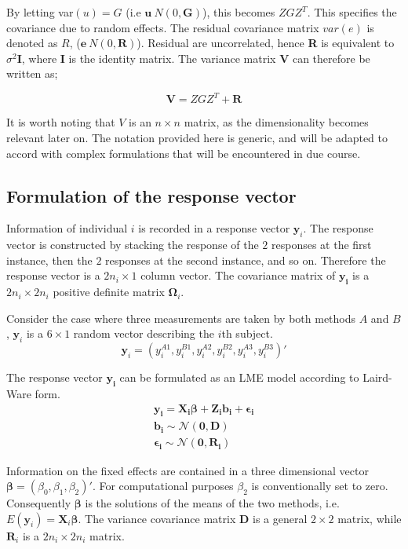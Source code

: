 \documentclass[12pt, a4paper]{report}
\theoremstyle{plain}
\theoremstyle{definition}
\theoremstyle{remark}
\begin{document}
By letting var$(u) = G$ (i.e $\textbf{u} ~ N(0,\textbf{G})$), this
becomes $ZGZ^{T}$. This specifies the covariance due to random
effects. The residual covariance matrix $var(e)$ is denoted as
$R$, ($\textbf{e} ~ N(0,\textbf{R})$). Residual are uncorrelated,
hence \textbf{R} is equivalent to $\sigma^{2}$\textbf{I}, where
\textbf{I} is the identity matrix. The variance matrix \textbf{V}
can therefore be written as;

\begin{equation}
\textbf{V}  = ZGZ^{T} + \textbf{R}
\end{equation}

It is worth noting that $V$ is an $n \times n$ matrix, as the dimensionality becomes relevant later on. The notation provided here is generic, and will be adapted to accord with complex formulations that will be encountered in due course.

\newpage

\subsection{Formulation of the response vector}
Information of individual $i$ is recorded in a response vector $\boldsymbol{y}_{i}$. The response vector is constructed by stacking the response of the $2$ responses at the first instance, then the $2$ responses at the second instance, and so on. Therefore the response vector is a $2n_{i} \times 1$ column vector.
The covariance matrix of $\boldsymbol{y_{i}}$ is a $2n_{i} \times 2n_{i}$ positive definite matrix $\boldsymbol{\Omega}_{i}$.

Consider the case where three measurements are taken by both methods $A$ and $B$, $\boldsymbol{y}_{i}$ is a $6 \times 1$ random vector describing the $i$th subject.
\[
\boldsymbol{y}_{i} = (y_{i}^{A1},y_{i}^{B1},y_{i}^{A2},y_{i}^{B2},y_{i}^{A3},y_{i}^{B3}) \prime
\]

The response vector $\boldsymbol{y_{i}}$ can be formulated as an LME model according to Laird-Ware form.
\begin{eqnarray*}
	\boldsymbol{y_{i}} = \boldsymbol{X_{i}\beta}  + \boldsymbol{Z_{i}b_{i}} + \boldsymbol{\epsilon_{i}}\\
	\boldsymbol{b_{i}} \sim \mathcal{N}(\boldsymbol{0,D})\\
	\boldsymbol{\epsilon_{i}} \sim \mathcal{N}(\boldsymbol{0,R_{i}})
\end{eqnarray*}

Information on the fixed effects are contained in a three dimensional vector $\boldsymbol{\beta} = (\beta_{0},\beta_{1},\beta_{2})\prime$. For computational purposes $\beta_{2}$ is conventionally set to zero. Consequently $\boldsymbol{\beta}$ is the solutions of the means of the two methods, i.e. $E(\boldsymbol{y}_{i})  = \boldsymbol{X}_{i}\boldsymbol{\beta}$. The variance covariance matrix $\boldsymbol{D}$ is a general $2 \times 2$ matrix, while $\boldsymbol{R}_{i}$ is a $2n_{i} \times 2n_{i}$ matrix.
\end{document}
